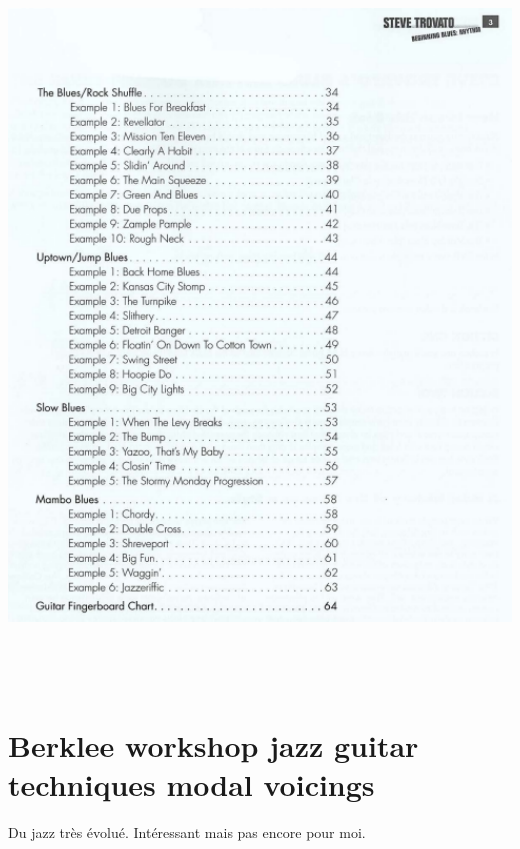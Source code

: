 \documentclass[a4paper]{book}
\begin{document}
\begin{center}
\includegraphics[width=15.954cm,height=19.419cm]{lebluessupportsmethodes-img55.png}
\end{center}





\section[Berklee workshop jazz guitar techniques modal
voicings]{Berklee workshop jazz guitar techniques modal voicings}
\hypertarget{RefHeadingToc120973218262}{}Du jazz tr\`es \'evolu\'e.
Int\'eressant mais pas encore pour moi.
\end{document}
